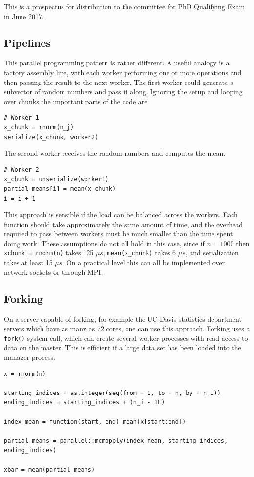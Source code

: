\documentclass[12pt]{article}
\begin{document}
This is a prospectus for distribution to the committee for PhD
Qualifying Exam in June 2017.

\subsection{Pipelines}

This parallel programming pattern is rather different. A useful analogy is a
factory assembly line, with each worker performing one or more operations
and then passing the result to the next worker. The first worker could generate a
subvector of random numbers and pass it along. Ignoring the setup and
looping over chunks the important parts of the code are:

\begin{verbatim}
# Worker 1
x_chunk = rnorm(n_j)
serialize(x_chunk, worker2)
\end{verbatim}

The second worker receives the random numbers and computes the mean.

\begin{verbatim}
# Worker 2
x_chunk = unserialize(worker1)
partial_means[i] = mean(x_chunk)
i = i + 1
\end{verbatim}

This approach is sensible if the load can be balanced across the workers.
Each function should take approximately the same amount of time, and the
overhead required to pass between workers must be much smaller than the
time spent doing work. These assumptions do not all hold in this case,
since if $n = 1000$ then \texttt{xchunk = rnorm(n)} takes 125 $\mu s$,
\texttt{mean(x\_chunk)} takes 6 $\mu s$, and serialization takes at least
15 $\mu s$. On a practical level this can all be implemented over network
sockets or through MPI.


\subsection{Forking}

On a server capable of forking, for example the UC Davis statistics
department servers which have as many as 72 cores, one can use this
approach. Forking uses a \texttt{fork()} system call, which can create
several worker processes with read access to data on the master. This is
efficient if a large data set has been loaded into the manager process.

\begin{verbatim}
x = rnorm(n)

starting_indices = as.integer(seq(from = 1, to = n, by = n_i))
ending_indices = starting_indices + (n_i - 1L)

index_mean = function(start, end) mean(x[start:end])

partial_means = parallel::mcmapply(index_mean, starting_indices, ending_indices)

xbar = mean(partial_means)
\end{verbatim}
\end{document}

